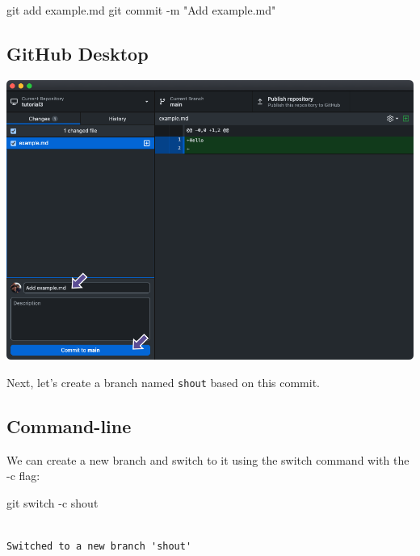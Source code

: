 \documentclass[
  letterpaper,
  DIV=11,
  numbers=noendperiod]{scrartcl}
\newenvironment{Shaded}{\begin{snugshade}}{\end{snugshade}}
\newcommand{\ControlFlowTok}[1]{\textcolor[rgb]{0.00,0.23,0.31}{#1}}
\newcommand{\NormalTok}[1]{\textcolor[rgb]{0.00,0.23,0.31}{#1}}
\newcommand{\SpecialCharTok}[1]{\textcolor[rgb]{0.37,0.37,0.37}{#1}}
\newcommand{\StringTok}[1]{\textcolor[rgb]{0.13,0.47,0.30}{#1}}
\begin{document}
\begin{Shaded}
\begin{Highlighting}[]
\NormalTok{git add example.md}
\NormalTok{git commit }\SpecialCharTok{{-}}\NormalTok{m }\StringTok{"Add example.md"}
\end{Highlighting}
\end{Shaded}

\subsection{GitHub Desktop}

\includegraphics{images/image28.png}

Next, let's create a branch named \texttt{shout} based on this commit.

\subsection{Command-line}

We can create a new branch and switch to it using the switch command
with the -c flag:

\begin{Shaded}
\begin{Highlighting}[]
\NormalTok{git }\ControlFlowTok{switch} \SpecialCharTok{{-}}\NormalTok{c shout}
\end{Highlighting}
\end{Shaded}

\begin{verbatim}

Switched to a new branch 'shout'
\end{verbatim}
\end{document}

